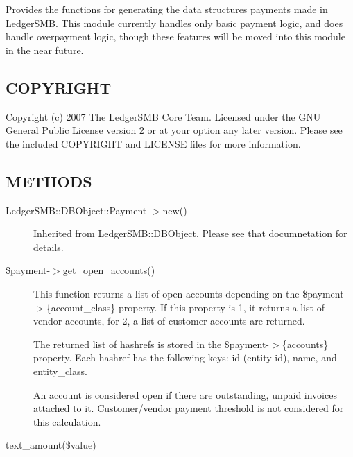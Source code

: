 \begin{description}
\begin{description}
\begin{description}
\begin{description}
\begin{description}
\begin{description}
\begin{description}
\begin{description}
\begin{description}
Provides the functions for generating the data structures payments made in 
LedgerSMB.   This module currently handles only basic payment logic, and does
handle overpayment logic, though these features will be moved into this module
in the near future.

\subsection*{COPYRIGHT\label{LedgerSMB::DBOject::Payment_COPYRIGHT}}


Copyright (c) 2007 The LedgerSMB Core Team.  Licensed under the GNU General 
Public License version 2 or at your option any later version.  Please see the
included COPYRIGHT and LICENSE files for more information.

\subsection*{METHODS\label{LedgerSMB::DBOject::Payment_METHODS}}
\begin{description}

\item[{LedgerSMB::DBObject::Payment-$>$new()}] \mbox{}

Inherited from LedgerSMB::DBObject.  Please see that documnetation for details.


\item[{\$payment-$>$get\_open\_accounts()}] \mbox{}

This function returns a list of open accounts depending on the 
\$payment-$>$\{account\_class\} property.  If this property is 1, it returns a list 
of vendor accounts, for 2, a list of customer accounts are returned.



The returned list of hashrefs is stored in the \$payment-$>$\{accounts\} property.
Each hashref has the following keys:  id (entity id), name, and entity\_class.



An account is considered open if there are outstanding, unpaid invoices 
attached to it.  Customer/vendor payment threshold is not considered for this 
calculation.

\end{description}
\begin{description}

\item[{text\_amount(\$value)}] \mbox{}


\end{description}
\end{description}
\end{description}
\end{description}
\end{description}
\end{description}
\end{description}
\end{description}
\end{description}
\end{description}

